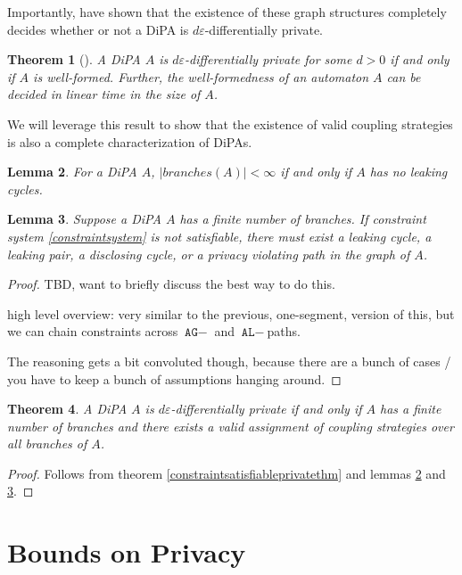 \documentclass[12pt]{article}
\newtheorem{thm}{Theorem}[section]
\newtheorem{lemma}[thm]{Lemma}
\theoremstyle{definition}
\begin{document}
Importantly, \cite{chadhaLinearTimeDecidability2021} have shown that the existence of these graph structures completely decides whether or not a DiPA is $d\varepsilon$-differentially private. 
\begin{thm}[\cite{chadhaLinearTimeDecidability2021}]
    A DiPA $A$ is $d\varepsilon$-differentially private for some $d > 0$ if and only if $A$ is well-formed. Further, the well-formedness of an automaton $A$ can be decided in linear time in the size of $A$. 
\end{thm}

We will leverage this result to show that the existence of valid coupling strategies is also a complete characterization of DiPAs.

\begin{lemma}\label{leakingcyclesbrancheslemma}
    For a DiPA $A$, $|branches(A)|< \infty$ if and only if $A$ has no leaking cycles. 
\end{lemma}

\begin{lemma}\label{unsatisfiablenoprivacylemma}
    Suppose a DiPA $A$ has a finite number of branches. If constraint system \ref{constraintsystem} is not satisfiable, there must exist a leaking cycle, a leaking pair, a disclosing cycle, or a privacy violating path in the graph of $A$.
\end{lemma}
\begin{proof}
    TBD, want to briefly discuss the best way to do this. 

    high level overview: very similar to the previous, one-segment, version of this, but we can chain constraints across $\texttt{AG}-$ and $\texttt{AL}-$paths.

    The reasoning gets a bit convoluted though, because there are a bunch of cases / you have to keep a bunch of assumptions hanging around.
\end{proof}

\begin{thm}
    A DiPA $A$ is $d\varepsilon$-differentially private if and only if $A$ has a finite number of branches and there exists a valid assignment of coupling strategies over all branches of $A$. 
\end{thm}
\begin{proof}
    Follows from theorem \ref{constraintsatisfiableprivatethm} and lemmas \ref{leakingcyclesbrancheslemma} and \ref{unsatisfiablenoprivacylemma}.
\end{proof}

\section{Bounds on Privacy}
\end{document}
